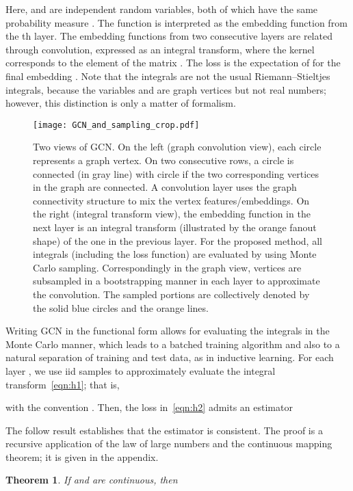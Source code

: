 \documentclass{article} \usepackage{iclr2018_conference,times}
\theoremstyle{plain}\newtheorem{theorem}{Theorem}\theoremstyle{plain}\newtheorem{proposition}[theorem]{Proposition}
\theoremstyle{plain}\newtheorem{corollary}[theorem]{Corollary}
\theoremstyle{plain}\newtheorem{lemma}[theorem]{Lemma}
\begin{document}
Here,  and  are independent random variables, both of which have the same probability measure . The function  is interpreted as the embedding function from the th layer. The embedding functions from two consecutive layers are related through convolution, expressed as an integral transform, where the kernel  corresponds to the  element of the matrix . The loss is the expectation of  for the final embedding . Note that the integrals are not the usual Riemann--Stieltjes integrals, because the variables  and  are graph vertices but not real numbers; however, this distinction is only a matter of formalism.

\begin{figure}[t]
\centering
\texttt{[image: GCN\_and\_sampling\_crop.pdf]}
\caption{Two views of GCN. On the left (graph convolution view), each circle represents a graph vertex. On two consecutive rows, a circle  is connected (in gray line) with circle  if the two corresponding vertices in the graph are connected. A convolution layer uses the graph connectivity structure to mix the vertex features/embeddings. On the right (integral transform view), the embedding function in the next layer is an integral transform (illustrated by the orange fanout shape) of the one in the previous layer. For the proposed method, all integrals (including the loss function) are evaluated by using Monte Carlo sampling. Correspondingly in the graph view, vertices are subsampled in a bootstrapping manner in each layer to approximate the convolution. The sampled portions are collectively denoted by the solid blue circles and the orange lines.}
\label{fig:architecture}
\end{figure}

Writing GCN in the functional form allows for evaluating the integrals in the Monte Carlo manner, which leads to a batched training algorithm and also to a natural separation of training and test data, as in inductive learning. For each layer , we use  iid samples  to approximately evaluate the integral transform~\eqref{eqn:h1}; that is,

with the convention .
Then, the loss  in~\eqref{eqn:h2} admits an estimator

The follow result establishes that the estimator is consistent. The proof is a recursive application of the law of large numbers and the continuous mapping theorem; it is given in the appendix.

\begin{theorem}\label{thm:L}
If  and  are continuous, then

\end{theorem}
\end{document}
